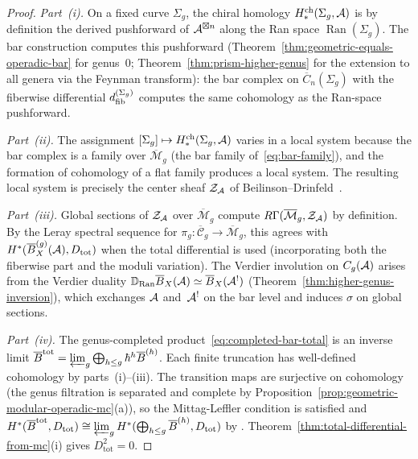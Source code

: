 \begin{proof}
\emph{Part~(i).}
On a fixed curve $\Sigma_g$, the chiral homology
$H^{\mathrm{ch}}_*(\Sigma_g, \mathcal{A})$ is by definition
\cite[3.4.4]{BD04} the derived pushforward of $\mathcal{A}^{\boxtimes n}$
along the Ran space $\operatorname{Ran}(\Sigma_g)$.  The bar
construction computes this pushforward
(Theorem~\ref{thm:geometric-equals-operadic-bar} for genus~$0$;
Theorem~\ref{thm:prism-higher-genus} for the extension to all
genera via the Feynman transform): the bar complex on
$\overline{C}_n(\Sigma_g)$ with the fiberwise differential
$d_{\mathrm{fib}}^{(\Sigma_g)}$ computes the same cohomology as the Ran-space
pushforward.

\emph{Part~(ii).}
The assignment $[\Sigma_g] \mapsto
H^{\mathrm{ch}}_*(\Sigma_g, \mathcal{A})$ varies in a local system because
the bar complex is a family over $\overline{\mathcal{M}}_g$
(the bar family of~\eqref{eq:bar-family}), and the formation of
cohomology of a flat family produces a local system.  The resulting
local system is precisely the center sheaf $\mathcal{Z}_{\mathcal{A}}$ of
Beilinson--Drinfeld~\cite[3.4.10]{BD04}.

\emph{Part~(iii).}
Global sections of $\mathcal{Z}_{\mathcal{A}}$ over
$\overline{\mathcal{M}}_g$ compute
$R\Gamma(\overline{\mathcal{M}}_g, \mathcal{Z}_{\mathcal{A}})$
by definition.
By the Leray spectral sequence for
$\pi_g\colon \overline{\mathcal{C}}_g \to \overline{\mathcal{M}}_g$,
this agrees with
$H^*(\overline{B}^{(g)}_X(\mathcal{A}), D_{\mathrm{tot}})$ when the total
differential is used (incorporating both the fiberwise part and
the moduli variation).  The Verdier involution on $C_g(\mathcal{A})$
arises from the Verdier duality
$\mathbb{D}_{\operatorname{Ran}} \overline{B}_X(\mathcal{A}) \simeq
\overline{B}_X(\mathcal{A}^!)$
(Theorem~\ref{thm:higher-genus-inversion}), which exchanges
$\mathcal{A}$ and~$\mathcal{A}^!$ on the bar level and induces $\sigma$ on
global sections.

\emph{Part~(iv).}
The genus-completed product~\eqref{eq:completed-bar-total} is
an inverse limit $\overline{B}^{\mathrm{tot}} = \varprojlim_g
\bigoplus_{h \leq g} \hbar^h \overline{B}^{(h)}$.  Each finite
truncation has well-defined cohomology by parts~(i)--(iii).
The transition maps are surjective on cohomology (the genus
filtration is separated and complete by
Proposition~\ref{prop:geometric-modular-operadic-mc}(a)),
so the Mittag-Leffler condition is satisfied and
$H^*(\overline{B}^{\mathrm{tot}}, D_{\mathrm{tot}})
\cong \varprojlim_g H^*(\bigoplus_{h \leq g}
\overline{B}^{(h)}, D_{\mathrm{tot}})$
by \cite[Proposition~3.5.7]{Weibel94}.
Theorem~\ref{thm:total-differential-from-mc}(i) gives
$D_{\mathrm{tot}}^2 = 0$.
\end{proof}


